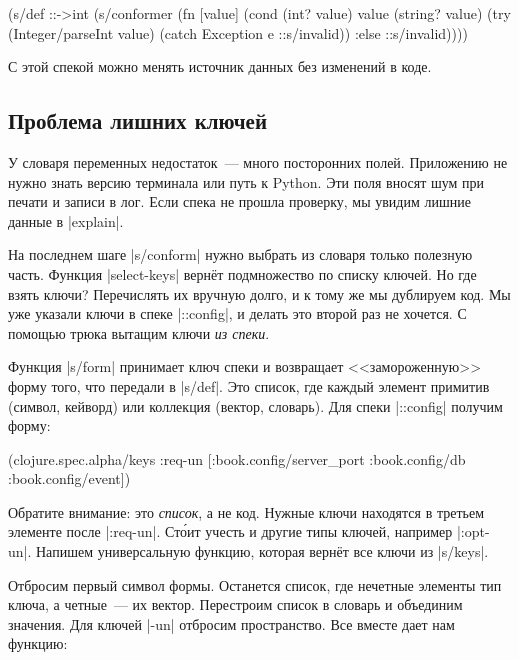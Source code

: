 \begin{english}
  \begin{clojure}
(s/def ::->int
  (s/conformer
   (fn [value]
     (cond
       (int? value) value
       (string? value)
       (try (Integer/parseInt value)
            (catch Exception e
              ::s/invalid))
       :else ::s/invalid))))
  \end{clojure}
\end{english}

\noindent
С этой спекой можно менять источник данных без изменений в коде.

\subsection{Проблема лишних ключей}

У словаря переменных недостаток~--- много посторонних полей. Приложению не нужно
знать версию терминала или путь к Python. Эти поля вносят шум при печати и
записи в лог. Если спека не прошла проверку, мы увидим лишние данные в
\spverb|explain|.

На последнем шаге \spverb|s/conform| нужно выбрать из словаря только полезную
часть. Функция \spverb|select-keys| верн\"{е}т подмножество по списку ключей. Но где
взять ключи? Перечислять их вручную долго, и к тому же мы дублируем код. Мы уже
указали ключи в спеке \spverb|::config|, и делать это второй раз не хочется. С
помощью трюка вытащим ключи \emph{из спеки}.

Функция \spverb|s/form| принимает ключ спеки и возвращает <<замороженную>> форму
того, что передали в \spverb|s/def|. Это список, где каждый элемент примитив
(символ, кейворд) или коллекция (вектор, словарь). Для спеки \spverb|::config|
получим форму:

\begin{english}
  \begin{clojure}
(clojure.spec.alpha/keys
 :req-un [:book.config/server_port
          :book.config/db
          :book.config/event])
  \end{clojure}
\end{english}

Обратите внимание: это \emph{список}, а не код. Нужные ключи находятся в третьем
элементе после \spverb|:req-un|. Ст\'{о}ит учесть и другие типы ключей, например
\spverb|:opt-un|. Напишем универсальную функцию, которая верн\"{е}т все ключи из
\spverb|s/keys|.

Отбросим первый символ формы. Останется список, где нечетные элементы тип ключа,
а четные~--- их вектор. Перестроим список в словарь и объединим значения. Для
ключей \spverb|-un| отбросим пространство. Все вместе дает нам функцию:

